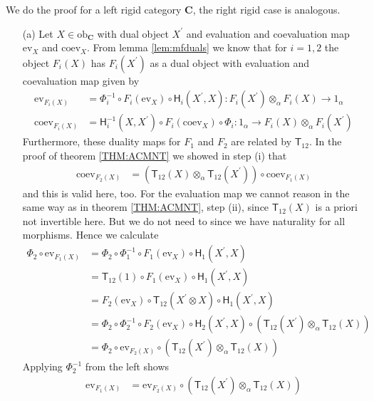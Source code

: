 \begin{prf}
We do the proof for a left rigid category $\mathbf{C}$, the right rigid case is analogous.
\begin{enumerate}
\item[(a)]
Let $X \in \mathrm{ob}_{\mathbf{C}}$ with dual object $X^{\prime}$ and evaluation and coevaluation map $\mathrm{ev}_{X}$ and $\mathrm{coev}_{X}$. From lemma \ref{lem:mfduals} we know that for $i = 1,2$ the object $F_{i}(X)$ has $F_{i}(X^{\prime})$ as a dual object with evaluation and coevaluation map given by
\begin{align*}
  \mathrm{ev}_{F_{i}(X)}
  &=
  \Phi_{i}^{-1}
  \circ
  F_{i}(\mathrm{ev}_{X})
  \circ
  \mathsf{H}_{i}(X^{\prime},X)
  \colon
  F_{i}(X^{\prime})
  \otimes_{\alpha}
  F_{i}(X)
  \to
  1_{\alpha}
  \\
  \mathrm{coev}_{F_{i}(X)}
  &=
  \mathsf{H}_{i}^{-1}(X,X^{\prime})
  \circ
  F_{i}(\mathrm{coev}_{X})
  \circ
  \Phi_{i}
  \colon
  1_{\alpha}
  \to
  F_{i}(X)
  \otimes_{\alpha}
  F_{i}(X^{\prime})
\end{align*}
Furthermore, these duality maps for $F_{1}$ and $F_{2}$ are related by $\mathsf{T}_{12}$. In the proof of theorem \ref{THM:ACMNT} we showed in step (i) that
\begin{align}
\label{F12coev}
  \mathrm{coev}_{F_{2}(X)}
  &=
  \left(
    \mathsf{T}_{12}(X)
    \otimes_{\alpha}
    \mathsf{T}_{12}(X^{\prime})
  \right)
  \circ
  \mathrm{coev}_{F_{1}(X)}
\end{align}
and this is valid here, too. For the evaluation map we cannot reason in the same way as in theorem \ref{THM:ACMNT}, step (ii), since $\mathsf{T}_{12}(X)$ is a priori not invertible here. But we do not need to since we have naturality for all morphisms. Hence we calculate
\begin{align*}
  \Phi_{2}
  \circ
  \mathrm{ev}_{F_{1}(X)}
  &=
  \Phi_{2}
  \circ
  \Phi_{1}^{-1}
  \circ
  F_{1}(\mathrm{ev}_{X})
  \circ
  \mathsf{H}_{1}(X^{\prime},X)
  \\
  &=
  \mathsf{T}_{12}(1)
  \circ
  F_{1}(\mathrm{ev}_{X})
  \circ
  \mathsf{H}_{1}(X^{\prime},X)
  \\
  &=
  F_{2}(\mathrm{ev}_{X})
  \circ
  \mathsf{T}_{12}(X^{\prime} \otimes X)
  \circ
  \mathsf{H}_{1}(X^{\prime},X)
  \\
  &=
  \Phi_{2}
  \circ
  \Phi_{2}^{-1}
  \circ
  F_{2}(\mathrm{ev}_{X})
  \circ
  \mathsf{H}_{2}(X^{\prime},X)
  \circ
  \left(
    \mathsf{T}_{12}(X^{\prime})
    \otimes_{\alpha}
    \mathsf{T}_{12}(X)
  \right)
  \\
  &=
  \Phi_{2}
  \circ
  \mathrm{ev}_{F_{2}(X)}
  \circ
  \left(
    \mathsf{T}_{12}(X^{\prime})
    \otimes_{\alpha}
    \mathsf{T}_{12}(X)
  \right)
\end{align*}
Applying $\Phi_{2}^{-1}$ from the left shows
\begin{align}
\label{F12ev}
  \mathrm{ev}_{F_{1}(X)}
  &=
  \mathrm{ev}_{F_{2}(X)}
  \circ
  \left(
    \mathsf{T}_{12}(X^{\prime})
    \otimes_{\alpha}
    \mathsf{T}_{12}(X)
  \right)
\end{align}


\end{enumerate}
\end{prf}
